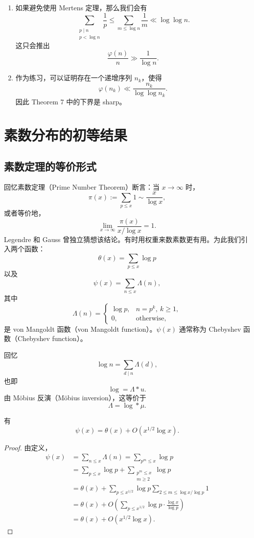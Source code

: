 \begin{remark}
	\begin{enumerate}[label=(\alph*)]
		\item 如果避免使用 Mertens 定理，那么我们会有
		\[
			\sum_{\substack{p\mid n\\ p<\log n}}\frac1p
			\leq
			\sum_{m\leq \log n}\frac1m
			\ll
			\log\log n.
		\]
		这只会推出
		\[
			\frac{\varphi(n)}n\gg \frac1{\log n}.
		\]
		\item 作为练习，可以证明存在一个递增序列 $n_k$，使得
		\[
			\varphi(n_k)\ll \frac{n_k}{\log\log n_k}.
		\]
		因此 Theorem 7 中的下界是 sharp。
	\end{enumerate}
\end{remark}

\chapter{素数分布的初等结果}

\section{素数定理的等价形式}


回忆素数定理（Prime Number Theorem）断言：当 $x\to\infty$ 时，
\[
	\pi(x):=\sum_{p\leq x}1\sim \frac{x}{\log x},
\]
或者等价地，
\[
	\lim_{x\to\infty}\frac{\pi(x)}{x/\log x}=1.
\]
Legendre 和 Gauss 曾独立猜想该结论。有时用权重来数素数更有用。为此我们引入两个函数：
\[
	\theta(x)=\sum_{p\leq x}\log p
\]
以及
\[
	\psi(x)=\sum_{n\leq x}\Lambda(n),
\]
其中
\[
	\Lambda(n)=
	\begin{cases}
		\log p, & n=p^k,\ k\geq 1,\\
		0, & \text{otherwise},
	\end{cases}
\]
是 von Mangoldt 函数（von Mangoldt function）。$\psi(x)$ 通常称为 Chebyshev 函数（Chebyshev function）。

回忆
\[
	\log n=\sum_{d\mid n}\Lambda(d),
\]
也即
\[
	\log=\Lambda*u.
\]
由 Möbius 反演（Möbius inversion），这等价于
\[
	\Lambda=\log*\mu.
\]

\begin{lemma}[原文 Lemma 3.1]
	有
	\[
		\psi(x)=\theta(x)+O(x^{1/2}\log x).
	\]
\end{lemma}

\begin{proof}
	由定义，
	\[
	\begin{aligned}
		\psi(x)
		&=
		\sum_{n\leq x}\Lambda(n)
		=
		\sum_{p^m\leq x}\log p \\
		&=
		\sum_{p\leq x}\log p
		+
		\sum_{\substack{p^m\leq x\\ m\geq 2}}\log p \\
		&=
		\theta(x)+
		\sum_{p\leq x^{1/2}}\log p
		\sum_{2\leq m\leq \log x/\log p}1 \\
		&=
		\theta(x)+
		O\left(
			\sum_{p\leq x^{1/2}}\log p\cdot \frac{\log x}{\log p}
		\right) \\
		&=
		\theta(x)+O(x^{1/2}\log x).
	\end{aligned}
	\]
\end{proof}

